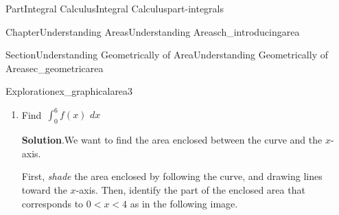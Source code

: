 \documentclass[oneside,10pt,]{tufte-book}
\newcommand{\blocktitlefont}{\relax}
\numberwithin{equation}{chapter}
\newcommand{\intdx}[1]{{\,\int#1\,\,dx}}
\newcommand{\lt}{<}
\begin{document}
\begin{partptx}{Part}{Integral Calculus}{}{Integral Calculus}{}{}{part-integrals}
\begin{chapterptx}{Chapter}{Understanding Areas}{}{Understanding Areas}{}{}{ch_introducingarea}
\begin{sectionptx}{Section}{Understanding Geometrically of Area}{}{Understanding Geometrically of Area}{}{}{sec_geometricarea}
\begin{exploration}{Exploration}{}{ex_graphicalarea3}
\begin{enumerate}[font=\bfseries,label=(\alph*),ref=\alph*]
\begin{image}{0.25}{0.5}{0.25}{}
{
}%
\end{image}%
The shaded area can be divided into \emph{three} regions:%
\begin{enumerate}
\item{}A triangle with base \(0\lt x\lt 2\) (\(b=2\)) and height \(h=1\) \emph{above} the \(x\)-axis.%
\item{}A triangle with base \(2\lt x\lt 3\) (\(b=1\)) and height \(h=1\) \emph{below} the \(x\)-axis.%
\item{}A rectangle with base \(3\lt x \lt 4\) (\(b=1\)) and height \(h=1\) \emph{below} the \(x\)-axis.%
\end{enumerate}
Putting this together,%
\begin{equation*}
\intdx{_0^6 f(x) } = (+) \frac{1}{2}\cdot 2 \cdot 1 + (-)\frac{1}{2}\cdot 1 \cdot 1 + (-)1\cdot 1 = -0.5
\end{equation*}
%
\item{}Find \(\intdx{_0^6 f(x) }\)%
\par\smallskip%
\noindent\textbf{\blocktitlefont Solution}.\hypertarget{ex_graphicalarea3-5-2}{}\quad{}We want to find the area enclosed between the curve and the \(x\)-axis.%
\par
First, \emph{shade} the area enclosed by following the curve, and drawing lines toward the \(x\)-axis. Then, identify the part of the enclosed area that corresponds to \(0\lt x \lt 4\) as in the following image.%
\begin{image}{0.25}{0.5}{0.25}{}%
\end{image}
\end{enumerate}
\end{exploration}
\end{sectionptx}
\end{chapterptx}
\end{partptx}
\end{document}
